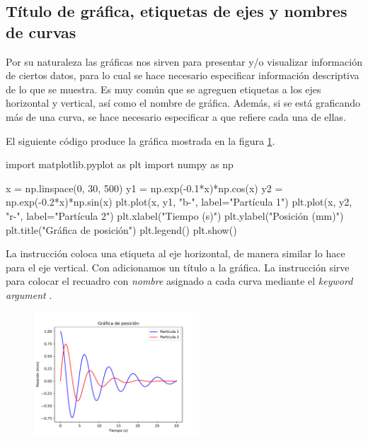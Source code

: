 \subsection{Título de gráfica, etiquetas de ejes y nombres de curvas}

Por su naturaleza las gráficas nos sirven para presentar y/o visualizar información de ciertos datos, para 
lo cual se hace necesario especificar información descriptiva de lo que se muestra. Es muy común 
que se agreguen etiquetas a los ejes horizontal y vertical, así como el nombre de gráfica. Además, si 
se está graficando más de una curva, se hace necesario especificar a que refiere cada una de ellas.

El siguiente código produce la gráfica mostrada en la figura \ref{fig:plot_xlabel_ylabel_title}. 

\begin{python}
import matplotlib.pyplot as plt
import numpy as np

x = np.linspace(0, 30, 500)
y1 = np.exp(-0.1*x)*np.cos(x)
y2 = np.exp(-0.2*x)*np.sin(x)
plt.plot(x, y1, "b-", label="Partícula 1")
plt.plot(x, y2, "r-", label="Partícula 2")
plt.xlabel("Tiempo (s)")
plt.ylabel("Posición (mm)")
plt.title("Gráfica de posición")
plt.legend()
plt.show()
\end{python}

La instrucción  coloca una etiqueta al eje horizontal, de manera similar  lo hace para el eje 
vertical. Con  adicionamos un título a la gráfica. La instrucción  sirve para 
colocar el recuadro con \textit{nombre} asignado a cada curva mediante el \textit{keyword argument} .

\begin{figure}[H]
	\centering
	\includegraphics[width=0.55\textwidth]{img/ch03/plot_xlabel_ylabel_title.pdf}
	\caption{}
	\label{fig:plot_xlabel_ylabel_title}
\end{figure}

